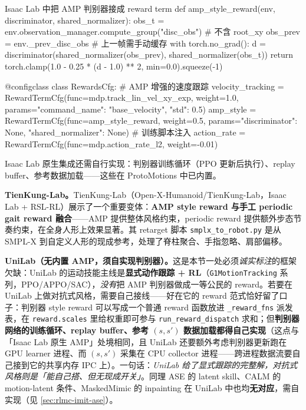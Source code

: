 \begin{codebox}[Python]{Isaac Lab 中把 AMP 判别器接成 reward term}
def amp_style_reward(env, discriminator, shared_normalizer):
    obs_t = env.observation_manager.compute_group("disc_obs")  # 不含 root_xy
    obs_prev = env._prev_disc_obs                              # 上一帧需手动缓存
    with torch.no_grad():
        d = discriminator(shared_normalizer(obs_prev), shared_normalizer(obs_t))
        return torch.clamp(1.0 - 0.25 * (d - 1.0) ** 2, min=0.0).squeeze(-1)

@configclass
class RewardsCfg:                       # AMP 增强的速度跟踪
    velocity_tracking = RewardTermCfg(func=mdp.track_lin_vel_xy_exp,
        weight=1.0, params={"command_name": "base_velocity", "std": 0.5})
    amp_style = RewardTermCfg(func=amp_style_reward, weight=0.5,
        params={"discriminator": None, "shared_normalizer": None})  # 训练脚本注入
    action_rate = RewardTermCfg(func=mdp.action_rate_l2, weight=-0.01)
\end{codebox}

Isaac Lab 原生集成还需自行实现：判别器训练循环（PPO 更新后执行）、replay buffer、参考数据加载——这些在 ProtoMotions 中已内置。

\textbf{TienKung-Lab。}TienKung-Lab（Open-X-Humanoid/TienKung-Lab，Isaac Lab + RSL-RL）展示了一个重要变体：\textbf{AMP style reward 与手工 periodic gait reward 融合}——AMP 提供整体风格约束，periodic reward 提供额外步态节奏约束，在全身人形上效果显著。其 retarget 脚本 \verb|smplx_to_robot.py| 是从 SMPL-X 到自定义人形的现成参考，处理了脊柱聚合、手指忽略、肩部偏移。

\textbf{UniLab（无内置 AMP，须自实现判别器）。}这是本节一处必须\emph{诚实标注}的框架欠缺：UniLab 的运动技能主线是\textbf{显式动作跟踪 + RL}（\verb|G1MotionTracking| 系列，PPO/APPO/SAC），\emph{没有}把 AMP 判别器做成一等公民的 reward。若要在 UniLab 上做对抗式风格，需要自己接线——好在它的 reward 范式恰好留了口子：判别器 style reward 可以写成一个普通 reward 函数放进 \verb|_reward_fns| 派发表，在 \verb|reward.scales| 里给权重即可参与 \verb|run_reward_dispatch| 求和；但\textbf{判别器网络的训练循环、replay buffer、参考 $(s,s')$ 数据加载都得自己实现}（这点与「Isaac Lab 原生 AMP」处境相同，且 UniLab 还要额外考虑判别器更新跑在 GPU learner 进程、而 $(s,s')$ 采集在 CPU collector 进程——跨进程数据流要自己接到它的共享内存 IPC 上）。一句话：\emph{UniLab 给了显式跟踪的完整解，对抗式风格则是「能自己搭、但无现成开关」}。同理 ASE 的 latent skill、CALM 的 motion-latent 条件、MaskedMimic 的 inpainting 在 UniLab 中也均\textbf{无对应}，需自实现（见 \cref{sec:rlmc-imit-ase}）。

